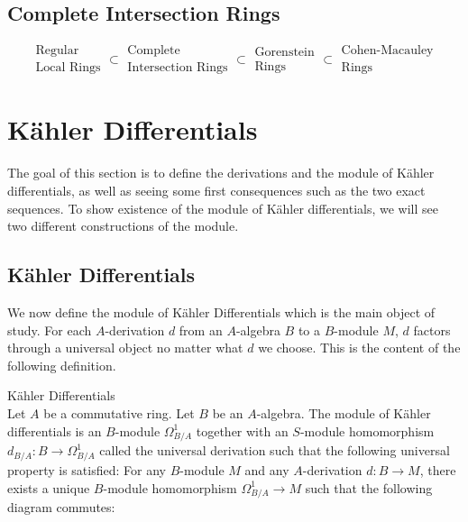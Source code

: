 \documentclass[a4paper]{article}
\begin{document}
\subsection{Complete Intersection Rings}

$$\substack{\text{Regular}\\\text{Local Rings}}\subset\substack{\text{Complete}\\\text{Intersection Rings}}\subset\substack{\text{Gorenstein}\\\text{Rings}}\subset\substack{\text{Cohen-Macauley}\\\text{Rings}}$$

\pagebreak
\section{Kähler Differentials}
The goal of this section is to define the derivations and the module of Kähler differentials, as well as seeing some first consequences such as the two exact sequences. To show existence of the module of Kähler differentials, we will see two different constructions of the module. 

\subsection{Kähler Differentials}
We now define the module of Kähler Differentials which is the main object of study. For each $A$-derivation $d$ from an $A$-algebra $B$ to a $B$-module $M$, $d$ factors through a universal object no matter what $d$ we choose. This is the content of the following definition. 

\begin{defn}{Kähler Differentials}{}\\
Let $A$ be a commutative ring. Let $B$ be an $A$-algebra. The module of Kähler differentials is an $B$-module $\Omega_{B/A}^1$ together with an $S$-module homomorphism $d_{B/A}:B\to\Omega_{B/A}^1$ called the universal derivation such that the following universal property is satisfied: For any $B$-module $M$ and any $A$-derivation $d:B\to M$, there exists a unique $B$-module homomorphism $\Omega_{B/A}^1\to M$ such that the following diagram commutes: \\~\\
 \\~\\
\end{defn}
\end{document}
